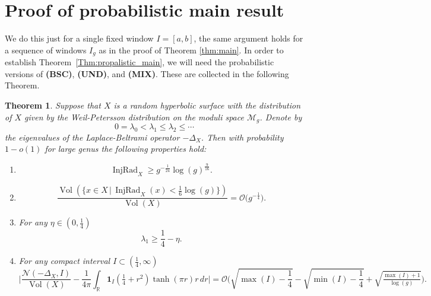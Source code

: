 \documentclass[11pt,twoside,reqno]{amsart}
\newcommand{\R}{\mathbb{R}}
\newcommand{\1}{\mathrm{\mathbf{1}}}
\DeclareMathOperator{\Vol}{Vol}
\DeclareMathOperator{\InjRad}{InjRad}
\numberwithin{equation}{section}
\theoremstyle{plain}
\newtheorem{theorem}[thm]{Theorem}
\theoremstyle{definition}
\theoremstyle{remark}
\begin{document}
\section{Proof of probabilistic main result}\label{SEC:outline_probabilistic_thm}

We do this just for a single fixed window $I = [a,b]$, the same argument holds for a sequence of windows $I_g$ as in the proof of Theorem \ref{thm:main}.  In order to establish Theorem~\ref{Thm:propalistic_main}, we will need the probabilistic versions of \textbf{(BSC)}, \textbf{(UND)}, and \textbf{(MIX)}. These are collected in the following Theorem.

\begin{theorem}\label{thm:properties_surface_large_genus}
    Suppose that $X$ is a random hyperbolic surface with the distribution of $X$ given by the Weil-Petersson distribution on the moduli space $\mathcal{M}_g$. Denote by
    \begin{equation*}
        0=\lambda_0<\lambda_1\leq \lambda_2 \leq \cdots 
    \end{equation*}
    the eigenvalues of the Laplace-Beltrami operator $-\Delta_X$. Then with probability $1-o(1)$ for large genus the following properties hold:
    \begin{enumerate}
        \item 
        \begin{equation*}
            \InjRad_X \geq g^{-\frac{1}{24}} \log(g)^{\frac{9}{16}}.    
        \end{equation*}

        \item 
        \begin{equation*}
            \frac{\Vol(\{ x\in X\,|\, \InjRad_X(x) <\frac{1}{6}\log(g)\}) }{\Vol(X)}=\mathcal{O}\big(g^{-\frac{1}{4}}\big).    
        \end{equation*}

        \item For any $\eta\in(0,\frac{1}{4})$
        \begin{equation*}
            \lambda_1 \geq \frac{1}{4} - \eta.
        \end{equation*}

        \item For any compact interval $I\subset (\frac{1}{4},\infty)$
        \begin{equation*}
            \Bigg|\frac{\mathcal{N}(-\Delta_X,I)}{\Vol(X)} - \frac{1}{4\pi} \int_\R \boldsymbol{1}_I (\tfrac{1}{4} +r^2) \tanh(\pi r) r \, dr \Bigg|=  \mathcal{O} \bigg(\sqrt{\max(I) -\frac{1}{4}} - \sqrt{\min(I)-\frac{1}{4}} +\sqrt{\tfrac{\max(I) +1}{\log(g)}} \bigg).
        \end{equation*}
    \end{enumerate}
\end{theorem}
\end{document}
